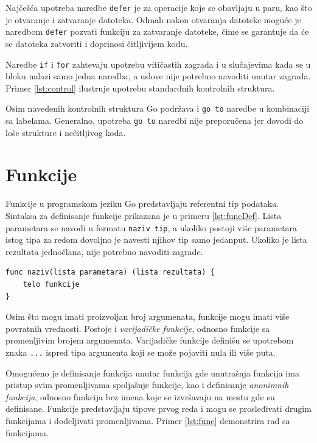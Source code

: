 \documentclass[12pt,oneside]{memoir}
\begin{document}
Najčešća upotreba naredbe \texttt{defer} je za operacije koje se obavljaju u paru, kao što je otvaranje i zatvaranje datoteka. Odmah nakon otvaranja datoteke moguće je naredbom \texttt{defer} pozvati funkciju za zatvaranje datoteke, čime se garantuje da će se datoteka zatvoriti i doprinosi čitljivijem kodu. 

Naredbe \texttt{if} i \texttt{for} zahtevaju upotrebu vitičastih zagrada i u slučajevima kada se u bloku nalazi samo jedna naredba, a uslove nije potrebno navoditi unutar zagrada. Primer  \ref{lst:control} ilustruje upotrebu standardnih kontrolnih struktura. 

Osim navedenih kontrolnih struktura Go podržava i \texttt{go to} naredbe u kombinaciji sa labelama. Generalno, upotreba \texttt{go to} naredbi nije preporučena jer dovodi do loše strukture i nečitljivog koda.


\section{Funkcije} \label{func}

Funkcije u programskom jeziku Go predstavljaju referentni tip podataka. Sintaksa za definisanje funkcije prikazana je u primeru \ref{lst:funcDef}. Lista parametara se navodi u formatu \texttt{naziv tip}, a ukoliko postoji više parametara istog tipa za redom dovoljno je navesti njihov tip samo jedanput. Ukoliko je lista rezultata jednočlana, nije potrebno navoditi zagrade.

\begin{center}
\begin{lstlisting}[caption=Sintaksa za definisanje funkcije, label={lst:funcDef},  backgroundcolor=\color{background}]
func naziv(lista parametara) (lista rezultata) {
	telo funkcije 
} 
\end{lstlisting}
\end{center}

Osim što mogu imati proizvoljan broj argumenata, funkcije mogu imati više povratnih vrednosti. Postoje i \textit{varijadičke funkcije}, odnosno funkcije sa promenljivim brojem argumenata. Varijadičke funkcije definišu se upotrebom znaka \texttt{...} ispred tipa argumenta koji se može pojaviti nula ili više puta. 

Omogućeno je definisanje funkcija unutar funkcija gde unutrašnja funkcija ima pristup svim promenljivama spoljašnje funkcije, kao i  definisanje \textit{anonimnih funkcija}, odnosno funkcija bez imena koje se izvršavaju na mestu gde su definisane. Funkcije predstavljaju tipove prvog reda i mogu se prosleđivati drugim funkcijama i dodeljivati promenljivama. Primer \ref{lst:func} demonstrira rad sa funkcijama.
\end{document}
